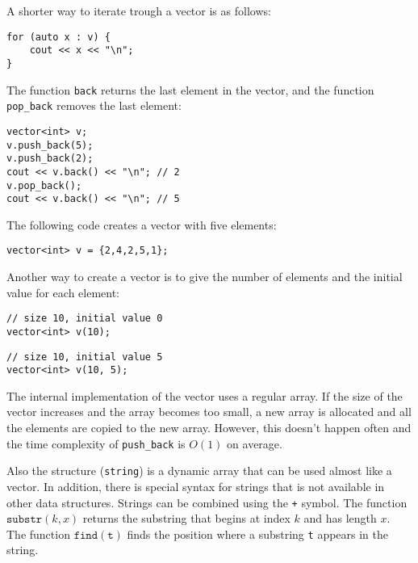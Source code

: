 \begin{samepage}
A shorter way to iterate trough a vector is as follows:

\begin{lstlisting}
for (auto x : v) {
    cout << x << "\n";
}
\end{lstlisting}
\end{samepage}

The function \texttt{back} returns the last element
in the vector, and
the function \texttt{pop\_back} removes the last element:

\begin{lstlisting}
vector<int> v;
v.push_back(5);
v.push_back(2);
cout << v.back() << "\n"; // 2
v.pop_back();
cout << v.back() << "\n"; // 5
\end{lstlisting}

The following code creates a vector with five elements:

\begin{lstlisting}
vector<int> v = {2,4,2,5,1};
\end{lstlisting}

Another way to create a vector is to give the number
of elements and the initial value for each element:

\begin{lstlisting}
// size 10, initial value 0
vector<int> v(10);
\end{lstlisting}
\begin{lstlisting}
// size 10, initial value 5
vector<int> v(10, 5);
\end{lstlisting}

The internal implementation of the vector
uses a regular array.
If the size of the vector increases and
the array becomes too small,
a new array is allocated and all the
elements are copied to the new array.
However, this doesn't happen often and the
time complexity of
\texttt{push\_back} is $O(1)$ on average.


Also the  structure (\texttt{string})
is a dynamic array that can be used almost like a vector.
In addition, there is special syntax for strings
that is not available in other data structures.
Strings can be combined using the \texttt{+} symbol.
The function $\texttt{substr}(k,x)$ returns the substring
that begins at index $k$ and has length $x$.
The function $\texttt{find}(\texttt{t})$ finds the position
where a substring \texttt{t} appears in the string.


